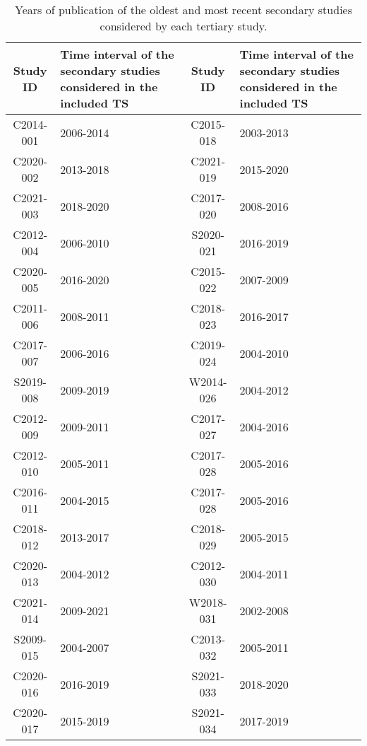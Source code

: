 \documentclass[sigconf]{acmart}
\begin{document}
\begin{table}[!ht]
\centering
\small
\caption{Years of publication of the oldest and most recent secondary studies considered by each tertiary study.}
\label{tab:MarcMNem} 
\begin{tabular}{|c|p{2cm}|c|p{2cm}|}
\hline Study ID & Time interval of the secondary studies considered in the included TS & Study ID & Time interval of the secondary studies considered in the included TS \\
\hline C2014-001 & 2006-2014 & C2015-018 & 2003-2013\\
\hline C2020-002 & 2013-2018 &  C2021-019 & 2015-2020\\
\hline C2021-003 & 2018-2020 & C2017-020 & 2008-2016\\
\hline C2012-004 & 2006-2010 & S2020-021 & 2016-2019\\
\hline C2020-005 & 2016-2020 & C2015-022 & 2007-2009\\
\hline C2011-006 & 2008-2011 & C2018-023 & 2016-2017\\
\hline C2017-007 & 2006-2016 & C2019-024 & 2004-2010\\
\hline S2019-008 & 2009-2019 & W2014-026 & 2004-2012\\
\hline C2012-009 & 2009-2011 & C2017-027 & 2004-2016\\
\hline C2012-010 & 2005-2011 & C2017-028 & 2005-2016\\
\hline C2016-011 & 2004-2015 & C2017-028 & 2005-2016\\
\hline C2018-012 & 2013-2017 & C2018-029 & 2005-2015\\
\hline C2020-013 & 2004-2012 & C2012-030 & 2004-2011\\
\hline C2021-014 & 2009-2021 & W2018-031 & 2002-2008\\
\hline S2009-015 & 2004-2007 & C2013-032 & 2005-2011\\
\hline C2020-016 & 2016-2019 & S2021-033 & 2018-2020\\
\hline C2020-017 & 2015-2019 & S2021-034 & 2017-2019\\
\hline 
\end{tabular} 
\end{table}

	

\end{document}
